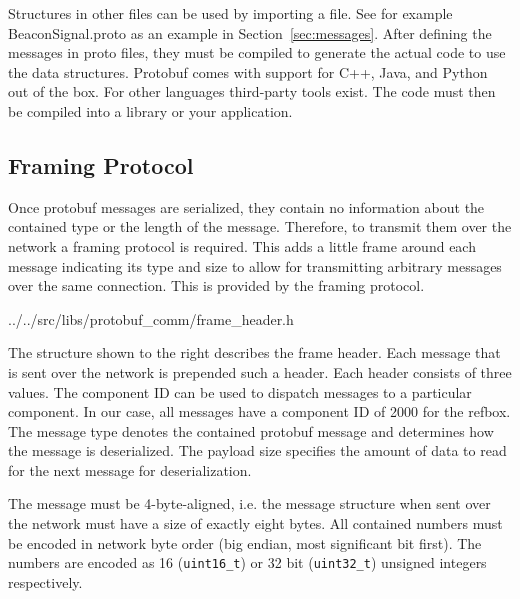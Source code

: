 \documentclass[a4paper]{article}
\newcommand{\refsec}[1]{Section~\ref{#1}}
\begin{document}
Structures in other files can be used by importing a file. See for
example BeaconSignal.proto as an example in
\refsec{sec:messages}. After defining the messages in proto files,
they must be compiled to generate the actual code to use the data
structures. Protobuf comes with support for C++, Java, and Python out
of the box. For other languages third-party tools exist. The code must
then be compiled into a library or your application.

\subsection{Framing Protocol}

\begin{minipage}{\linewidth}
  \begin{minipage}[t]{.64\linewidth}
    \vspace{0pt}
Once protobuf messages are serialized, they contain no information
about the contained type or the length of the message. Therefore, to
transmit them over the network a framing protocol is required. This
adds a little frame around each message indicating its type and size
to allow for transmitting arbitrary messages over the same
connection. This is provided by the framing protocol.
  \end{minipage}
  \hspace{.01\linewidth}
  \begin{minipage}[t]{.34\linewidth}
    \vspace{0pt}

{../../src/libs/protobuf_comm/frame_header.h}
  \end{minipage}
\end{minipage}

\smallskip

The structure shown to the right describes the frame header. Each
message that is sent over the network is prepended such a header. Each
header consists of three values. The component ID can be used to
dispatch messages to a particular component. In our case, all messages
have a component ID of 2000 for the refbox. The message type denotes
the contained protobuf message and determines how the message is
deserialized. The payload size specifies the amount of data to read
for the next message for deserialization.

The message must be 4-byte-aligned, i.e. the message structure when
sent over the network must have a size of exactly eight bytes. All
contained numbers must be encoded in network byte order (big endian,
most significant bit first). The numbers are encoded as 16
(\texttt{uint16\_t}) or 32 bit (\texttt{uint32\_t}) unsigned integers
respectively.
\end{document}

